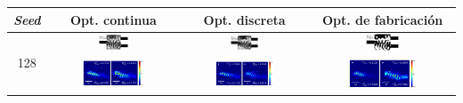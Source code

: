 \begin{landscape}
\begin{table}[ht]
    \centering
    \vspace*{-2.5cm}
    \hspace*{-5cm}
    \begin{tabular}{|c|c|c|c|}
    \hline 
    \emph{Seed} & Opt. continua & Opt. discreta &  Opt. de fabricación \\
    \hline
      \multirow{2}{*}{128} &
      \includegraphics[width=0.24\textwidth]{image/results/wdm/CMA-ES/visualize_eps_cont_128.png} &
      \includegraphics[width=0.24\textwidth]{image/results/wdm/CMA-ES/visualize_eps_disc_128.png} &
      \includegraphics[width=0.24\textwidth]{image/results/wdm/CMA-ES/visualize_eps_fab_128.png} \\
      \cline{2-4}
      &
      \includegraphics[width=0.50\textwidth]{image/results/wdm/CMA-ES/visualize_field_cont_128.png} &
      \includegraphics[width=0.50\textwidth]{image/results/wdm/CMA-ES/visualize_field_disc_128.png} &
      \includegraphics[width=0.50\textwidth]{image/results/wdm/CMA-ES/visualize_field_fab_128.png} \\

\end{tabular}
\end{table}
\end{landscape}

